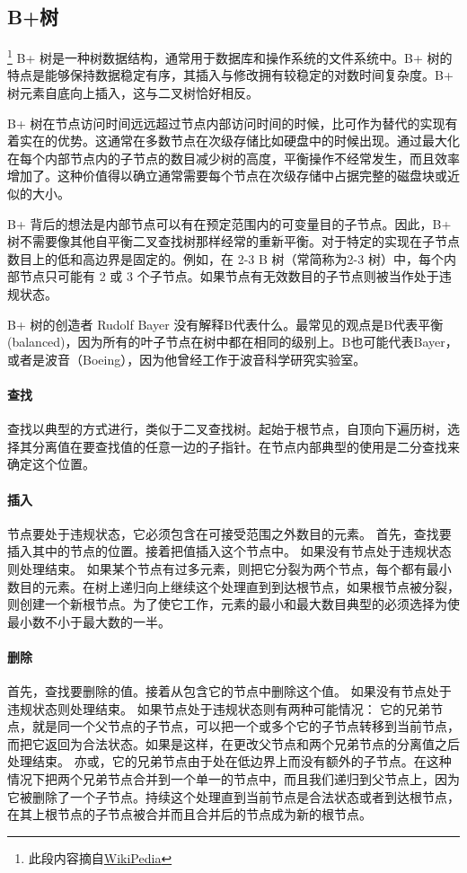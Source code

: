 \documentclass[UTF8]{ctexrep} %
\begin{document}
\subsection{B+树}
\footnote{此段内容摘自\href{https://en.wikipedia.org/wiki/B+_tree}{WikiPedia}}
B+ 树是一种树数据结构，通常用于数据库和操作系统的文件系统中。B+ 树的特点是能够保持数据稳定有序，其插入与修改拥有较稳定的对数时间复杂度。B+ 树元素自底向上插入，这与二叉树恰好相反。
\par
B+ 树在节点访问时间远远超过节点内部访问时间的时候，比可作为替代的实现有着实在的优势。这通常在多数节点在次级存储比如硬盘中的时候出现。通过最大化在每个内部节点内的子节点的数目减少树的高度，平衡操作不经常发生，而且效率增加了。这种价值得以确立通常需要每个节点在次级存储中占据完整的磁盘块或近似的大小。
\par
B+ 背后的想法是内部节点可以有在预定范围内的可变量目的子节点。因此，B+ 树不需要像其他自平衡二叉查找树那样经常的重新平衡。对于特定的实现在子节点数目上的低和高边界是固定的。例如，在 2-3 B 树（常简称为2-3 树）中，每个内部节点只可能有 2 或 3 个子节点。如果节点有无效数目的子节点则被当作处于违规状态。
\par
B+ 树的创造者 Rudolf Bayer 没有解释B代表什么。最常见的观点是B代表平衡(balanced)，因为所有的叶子节点在树中都在相同的级别上。B也可能代表Bayer，或者是波音（Boeing），因为他曾经工作于波音科学研究实验室。

\paragraph{查找}
查找以典型的方式进行，类似于二叉查找树。起始于根节点，自顶向下遍历树，选择其分离值在要查找值的任意一边的子指针。在节点内部典型的使用是二分查找来确定这个位置。

\paragraph{插入}
节点要处于违规状态，它必须包含在可接受范围之外数目的元素。
首先，查找要插入其中的节点的位置。接着把值插入这个节点中。
如果没有节点处于违规状态则处理结束。
如果某个节点有过多元素，则把它分裂为两个节点，每个都有最小数目的元素。在树上递归向上继续这个处理直到到达根节点，如果根节点被分裂，则创建一个新根节点。为了使它工作，元素的最小和最大数目典型的必须选择为使最小数不小于最大数的一半。

\paragraph{删除}
首先，查找要删除的值。接着从包含它的节点中删除这个值。
如果没有节点处于违规状态则处理结束。
如果节点处于违规状态则有两种可能情况：
它的兄弟节点，就是同一个父节点的子节点，可以把一个或多个它的子节点转移到当前节点，而把它返回为合法状态。如果是这样，在更改父节点和两个兄弟节点的分离值之后处理结束。
亦或，它的兄弟节点由于处在低边界上而没有额外的子节点。在这种情况下把两个兄弟节点合并到一个单一的节点中，而且我们递归到父节点上，因为它被删除了一个子节点。持续这个处理直到当前节点是合法状态或者到达根节点，在其上根节点的子节点被合并而且合并后的节点成为新的根节点。
\end{document}
